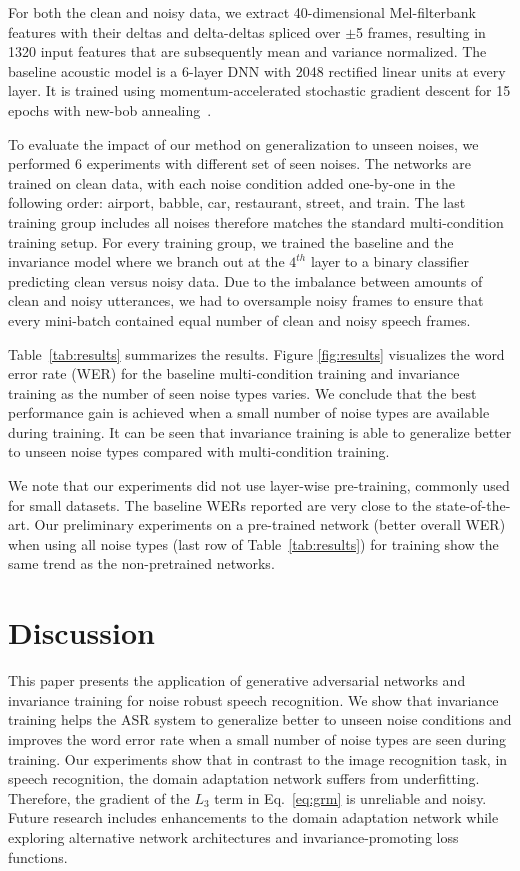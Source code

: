 \documentclass[a4paper]{article}
\begin{document}
For both the clean and noisy data, we extract 40-dimensional Mel-filterbank features with their deltas and 
delta-deltas spliced over $\pm$5 frames, resulting in 1320 input 
features that are subsequently mean and variance normalized. The baseline acoustic model is a 6-layer 
DNN with 2048 rectified linear units at every layer. It is trained using 
momentum-accelerated stochastic gradient descent for 15 epochs with new-bob 
annealing~\citep[as in][]{morgan1995continuous,sainath2011making}.

To evaluate the impact of our method on generalization to unseen noises,
we performed 6 experiments with different set of seen noises. The networks are trained
on clean data, with each noise condition added one-by-one in the following order: airport, babble, car, 
restaurant, street, and train. The last training group includes all noises therefore matches the
standard multi-condition training setup. For every training group, we trained the
baseline and the invariance model where we branch out at the $4^{th}$ layer to a
binary classifier predicting clean versus noisy data. Due to the imbalance between amounts of clean and
noisy utterances, we had to oversample noisy frames to ensure that every mini-batch contained
equal number of clean and noisy speech frames.

Table~\ref{tab:results} summarizes the results. Figure \ref{fig:results} visualizes 
the word error rate (WER) for the baseline multi-condition training and invariance training 
as the number of seen noise types varies. We conclude that the best performance
gain is achieved when a small number of noise types are available during training. 
It can be seen that invariance training is able to generalize better to unseen 
noise types compared with multi-condition training.

We note that our experiments did not use layer-wise pre-training, commonly used for small
datasets. The baseline WERs reported are very close to the state-of-the-art. 
Our preliminary experiments on a pre-trained network (better overall WER) when 
using all noise types (last row of Table~\ref{tab:results}) for training show 
the same trend as the non-pretrained networks.

\section{Discussion}
\label{sec:discussion}
    This paper presents the application of generative adversarial networks and 
    invariance training for noise robust speech recognition. We show that invariance training 
    helps the ASR system to generalize better to unseen noise conditions and improves 
    the word error rate when a small number of noise types are seen during training. Our 
    experiments show that in contrast to the image recognition task, in speech 
    recognition, the domain adaptation network suffers from underfitting. Therefore, the 
    gradient of the $L_3$ term in Eq.~\ref{eq:grm} is unreliable and noisy. Future 
    research includes enhancements to the domain adaptation network while exploring 
    alternative network architectures and invariance-promoting loss functions.
\end{document}
